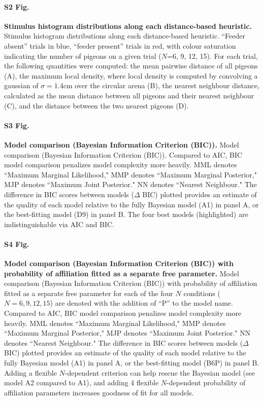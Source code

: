 \documentclass{article}
\begin{document}
\paragraph*{S2 Fig.}
\label{S2_Fig}
{\bf Stimulus histogram distributions along each distance-based heuristic. }Stimulus histogram distributions along each distance-based heuristic. ``Feeder absent'' trials in blue, ``feeder present'' trials in red, with colour saturation indicating the number of pigeons on a given trial ($N$=6, 9, 12, 15). For each trial, the following quantities were computed: the mean pairwise distance of all pigeons (A), the maximum local density, where local density is computed by convolving a gaussian of $\sigma=1.4$cm over the circular arena (B), the nearest neighbour distance, calculated as the mean distance between all pigeons and their nearest neighbour (C), and the distance between the two nearest pigeons (D).

\paragraph*{S3 Fig.}
\label{S3_Fig}
{\bf Model comparison (Bayesian Information Criterion (BIC)). }Model comparison (Bayesian Information Criterion (BIC)). Compared to AIC, BIC model comparison penalizes model complexity more heavily. MML denotes ``Maximum Marginal Likelihood," MMP denotes ``Maximum Marginal Posterior," MJP denotes ``Maximum Joint Posterior." NN denotes ``Nearest Neighbour." The difference in BIC scores between models ($\Delta$ BIC) plotted provides an estimate of the quality of each model relative to the fully Bayesian model (A1) in panel A, or the best-fitting model (D9) in panel B. The four best models (highlighted) are indistinguishable via AIC and BIC.

\paragraph*{S4 Fig.}
\label{S4_Fig}
{\bf Model comparison (Bayesian Information Criterion (BIC)) with probability of affiliation fitted as a separate free parameter. }Model comparison (Bayesian Information Criterion (BIC)) with probability of affiliation fitted as a separate free parameter for each of the four $N$ conditions ($N=6, 9, 12, 15$) are denoted with the addition of ``P'' to the model name. Compared to AIC, BIC model comparison penalizes model complexity more heavily. MML denotes ``Maximum Marginal Likelihood," MMP denotes ``Maximum Marginal Posterior," MJP denotes ``Maximum Joint Posterior." NN denotes ``Nearest Neighbour." The difference in BIC scores between models ($\Delta$ BIC) plotted provides an estimate of the quality of each model relative to the fully Bayesian model (A1) in panel A, or the best-fitting model (B6P) in panel B. Adding a flexible $N$-dependent criterion can help rescue the Bayesian model (see model A2 compared to A1), and adding 4 flexible $N$-dependent probability of affiliation parameters increases goodness of fit for all models.
\end{document}
